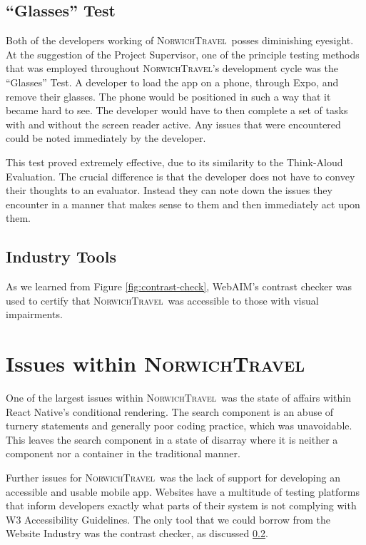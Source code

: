 \documentclass[cmpstyle]{ueacmpstyle}
\newcommand{\nt}{\textsc{NorwichTravel}}
\begin{document}
		\subsection{``Glasses'' Test} \label{sec:glasses}
		Both of the developers working of \nt \ posses diminishing eyesight. At the suggestion of the Project Supervisor, one of the principle testing methods that was employed throughout \nt's development cycle was the ``Glasses'' Test. A developer to load the app on a phone, through Expo, and remove their glasses. The phone would be positioned in such a way that it became hard to see. The developer would have to then complete a set of tasks with and without the screen reader active. Any issues that were encountered could be noted immediately by the developer. 
		
		This test proved extremely effective, due to its similarity to the Think-Aloud Evaluation. The crucial difference is that the developer does not have to convey their thoughts to an evaluator. Instead they can note down the issues they encounter in a manner that makes sense to them and then immediately act upon them. 
		
		\subsection{Industry Tools} \label{sec:industry-tools}
		As we learned from Figure \ref{fig:contrast-check}, WebAIM's contrast checker was used to certify that \nt \ was accessible to those with visual impairments. 
		
	\section{Issues within \nt} \label{sec:major}
	One of the largest issues within \nt \ was the state of affairs within React Native's conditional rendering. The search component is an abuse of turnery statements and generally poor coding practice, which was unavoidable. This leaves the search component in a state of disarray where it is neither a component nor a container in the traditional manner.
	
	Further issues for \nt \ was the lack of support for developing an accessible and usable mobile app. Websites have a multitude of testing platforms that inform developers exactly what parts of their system is not complying with W3 Accessibility Guidelines. The only tool that we could borrow from the Website Industry was the contrast checker, as discussed \ref{sec:industry-tools}.
	
\end{document}
